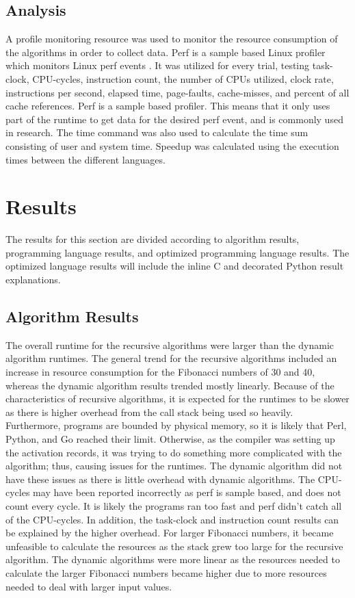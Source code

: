 \documentclass{sig-alternate}
\begin{document}
\subsection{Analysis}

A profile monitoring resource was used to monitor the resource consumption of the algorithms in order to collect data. Perf is a sample based Linux profiler which monitors Linux perf events \cite{perf}. It was utilized for every trial, testing task-clock, CPU-cycles, instruction count, the number of CPUs utilized, clock rate, instructions per second, elapsed time, page-faults, cache-misses, and percent of all cache references. Perf is a sample based profiler. This means that it only uses part of the runtime to get data for the desired perf event, and is commonly used in research. The time command was also used to calculate the time sum consisting of user and system time. Speedup was calculated using the execution times between the different languages.

\section{Results}

The results for this section are divided according to algorithm results, programming language results, and optimized programming language results. The optimized language results will include the inline C and decorated Python result explanations.

\subsection{Algorithm Results}

The overall runtime for the recursive algorithms were larger than the dynamic algorithm runtimes. The general trend for the recursive algorithms included an increase in resource consumption for the Fibonacci numbers of 30 and 40, whereas the dynamic algorithm results trended mostly linearly. Because of the characteristics of recursive algorithms, it is expected for the runtimes to be slower as there is higher overhead from the call stack being used so heavily. Furthermore, programs are bounded by physical memory, so it is likely that Perl, Python, and Go reached their limit. Otherwise, as the compiler was setting up the activation records, it was trying to do something more complicated with the algorithm; thus, causing issues for the runtimes. The dynamic algorithm did not have these issues as there is little overhead with dynamic algorithms. The CPU-cycles may have been reported incorrectly as perf is sample based, and does not count every cycle. It is likely the programs ran too fast and perf didn’t catch all of the CPU-cycles. In addition, the task-clock and instruction count results can be explained by the higher overhead. For larger Fibonacci numbers, it became unfeasible to calculate the resources as the stack grew too large for the recursive algorithm. The dynamic algorithms were more linear as the resources needed to calculate the larger Fibonacci numbers became higher due to more resources needed to deal with larger input values.
\end{document}
